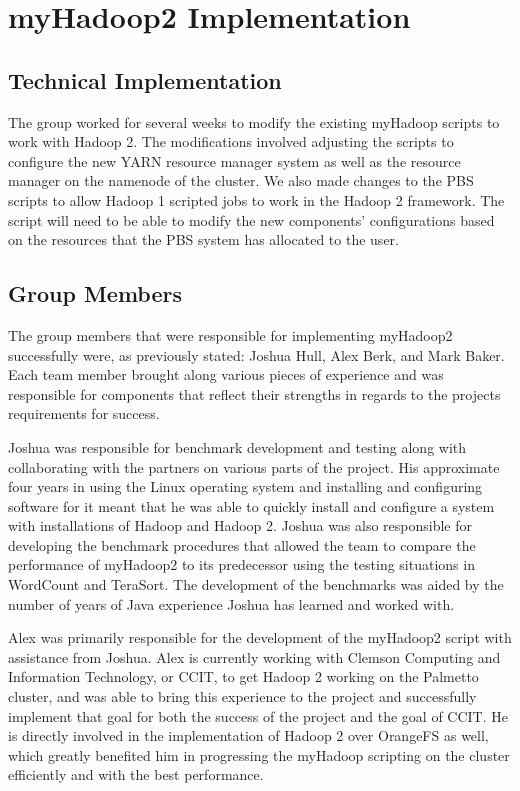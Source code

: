 \documentclass[conference]{IEEEtran}
\begin{document}
	\section{myHadoop2 Implementation}
		\subsection{Technical Implementation}
			The group worked for several weeks to modify the existing myHadoop scripts to work with Hadoop 2. The modifications involved adjusting the scripts to configure the new YARN resource manager system as well as the resource manager on the namenode of the cluster. We also made changes to the PBS scripts to allow Hadoop 1 scripted jobs to work in the Hadoop 2 framework. The script will need to be able to modify the new components’ configurations based on the resources that the PBS system has allocated to the user.

		\subsection{Group Members}
			The group members that were responsible for implementing myHadoop2 successfully were, as previously stated: Joshua Hull, Alex Berk, and Mark Baker. Each team member brought along various pieces of experience and was responsible for components that reflect their strengths in regards to the projects requirements for success. 

			Joshua was responsible for benchmark development and testing along with collaborating with the partners on various parts of the project. His approximate four years in using the Linux operating system and installing and configuring software for it meant that he was able to quickly install and configure a system with installations of Hadoop and Hadoop 2. Joshua was also responsible for developing the benchmark procedures that allowed the team to compare the performance of myHadoop2 to its predecessor using the testing situations in WordCount and TeraSort. The development of the benchmarks was aided by the number of years of Java experience Joshua has learned and worked with.

			Alex was primarily responsible for the development of the myHadoop2 script with assistance from Joshua. Alex is currently working with Clemson Computing and Information Technology, or CCIT, to get Hadoop 2 working on the Palmetto cluster, and was able to bring this experience to the project and successfully implement that goal for both the success of the project and the goal of CCIT. He is directly involved in the implementation of Hadoop 2 over OrangeFS as well, which greatly benefited him in progressing the myHadoop scripting on the cluster efficiently and with the best performance.
\end{document}
